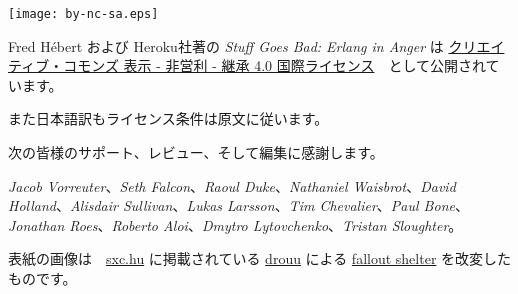 \clearpage
\thispagestyle{fancy}

\fancyhf{} %
\renewcommand{\headrulewidth}{0pt} %
\renewcommand{\footrulewidth}{0pt}

\vspace*{\fill}


\begin{center}
\texttt{[image: by-nc-sa.eps]}
\end{center}

\begin{center}
Fred Hébert および Heroku社著の \emph{Stuff Goes Bad: Erlang in Anger} は \href{http://creativecommons.org/licenses/by-nc-sa/4.0/}{クリエイティブ・コモンズ 表示 - 非営利 - 継承 4.0 国際ライセンス}　として公開されています。
\end{center}

また日本語訳もライセンス条件は原文に従います。

次の皆様のサポート、レビュー、そして編集に感謝します。

\emph{Jacob Vorreuter}、\emph{Seth Falcon}、\emph{Raoul Duke}、\emph{Nathaniel Waisbrot}、\emph{David Holland}、\emph{Alisdair Sullivan}、\emph{Lukas Larsson}、\emph{Tim Chevalier}、\emph{Paul Bone}、\emph{Jonathan Roes}、\emph{Roberto Aloi}、\emph{Dmytro Lytovchenko}、\emph{Tristan Sloughter}。

\null
\vfill
表紙の画像は　\href{http://sxc.hu}{sxc.hu} に掲載されている \href{http://www.freeimages.com/profile/drouu}{drouu} による \href{http://www.freeimages.com/photo/533163}{fallout shelter} を改変したものです。


